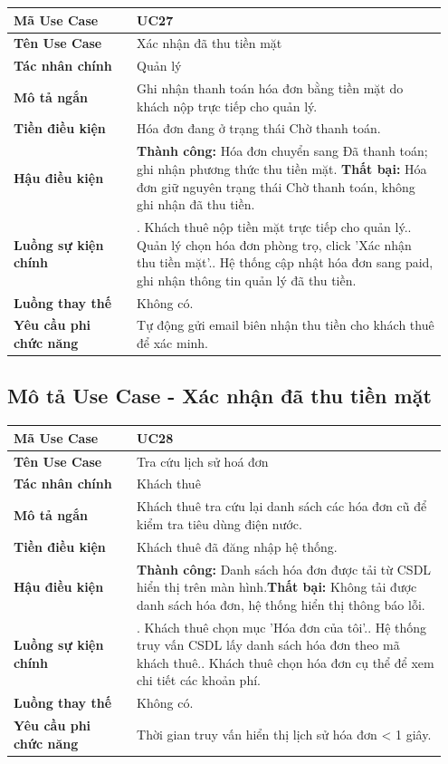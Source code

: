 \documentclass[a4paper,oneside]{report}
\begin{document}
\begin{longtable}[]{@{}>{\RaggedRight\arraybackslash}p{0.27\linewidth}>{\RaggedRight\arraybackslash}p{0.68\linewidth}@{}}
\toprule
\textbf{Mã Use Case} & UC27\tabularnewline
\midrule
\endhead
\textbf{Tên Use Case} & Xác nhận đã thu tiền mặt\tabularnewline
\textbf{Tác nhân chính} & Quản lý\tabularnewline
\textbf{Mô tả ngắn} & Ghi nhận thanh toán hóa đơn bằng tiền mặt do khách
nộp trực tiếp cho quản lý.\tabularnewline
\textbf{Tiền điều kiện} & Hóa đơn đang ở trạng thái Chờ thanh
toán.\tabularnewline
\textbf{Hậu điều kiện} & \textbf{Thành công:} Hóa đơn chuyển sang Đã thanh toán; ghi nhận phương thức thu tiền mặt.\newline 
\textbf{Thất bại:} Hóa đơn giữ nguyên trạng thái Chờ thanh toán, không ghi nhận đã thu tiền.\tabularnewline
\textbf{Luồng sự kiện chính} & 1. Khách thuê nộp tiền
mặt trực tiếp cho quản lý.\newline 2. Quản lý chọn hóa đơn phòng
trọ, click 'Xác nhận thu tiền mặt'.\newline 3. Hệ thống cập nhật
hóa đơn sang paid, ghi nhận thông tin quản lý đã thu
tiền.\tabularnewline
\textbf{Luồng thay thế} & Không có.\tabularnewline
\textbf{Yêu cầu phi chức năng} & Tự động gửi email biên nhận thu tiền
cho khách thuê để xác minh.\tabularnewline
\bottomrule
\end{longtable}

\subsection{Mô tả Use Case - Xác nhận đã thu tiền mặt}

\begin{longtable}[]{@{}>{\RaggedRight\arraybackslash}p{0.27\linewidth}>{\RaggedRight\arraybackslash}p{0.68\linewidth}@{}}
\toprule
\textbf{Mã Use Case} & UC28\tabularnewline
\midrule
\endhead
\textbf{Tên Use Case} & Tra cứu lịch sử hoá đơn\tabularnewline
\textbf{Tác nhân chính} & Khách thuê\tabularnewline
\textbf{Mô tả ngắn} & Khách thuê tra cứu lại danh sách các hóa đơn cũ để
kiểm tra tiêu dùng điện nước.\tabularnewline
\textbf{Tiền điều kiện} & Khách thuê đã đăng nhập hệ
thống.\tabularnewline
\textbf{Hậu điều kiện} & \textbf{Thành công:} Danh sách hóa đơn được tải từ CSDL hiển thị trên màn hình.\newline \textbf{Thất bại:} Không tải được danh sách hóa đơn, hệ thống hiển thị thông báo lỗi.\tabularnewline
\textbf{Luồng sự kiện chính} & 1. Khách thuê chọn mục
'Hóa đơn của tôi'.\newline 2. Hệ thống truy vấn CSDL lấy danh sách
hóa đơn theo mã khách thuê.\newline 3. Khách thuê chọn hóa đơn cụ
thể để xem chi tiết các khoản phí.\tabularnewline
\textbf{Luồng thay thế} & Không có.\tabularnewline
\textbf{Yêu cầu phi chức năng} & Thời gian truy vấn hiển thị lịch sử hóa
đơn \textless{} 1 giây.\tabularnewline
\bottomrule
\end{longtable}
\end{document}
